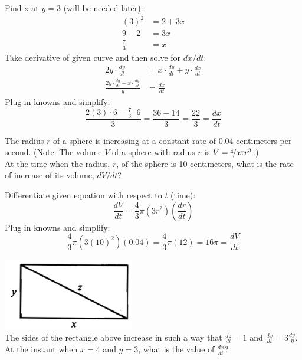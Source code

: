 \documentclass[12pt,letterpaper, onecolumn]{exam}
\begin{document}
\begin{questions}
\begin{solution}
			Find x at $y=3$ (will be needed later):
			\begin{align*}
				(3)^2 &= 2 + 3x \\
				9 - 2 &= 3x \\
				\frac{7}{3} &= x
			\end{align*}
			Take derivative of given curve and then solve for $dx/dt$:
			\begin{align*}
				2y \cdot \frac{dy}{dt} &= x \cdot \frac{dy}{dt} + y \cdot \frac{dx}{dt} \\
				\frac{ 2y \cdot \frac{dy}{dt} - x \cdot \frac{dy}{dt} } { y } &= \frac{dx}{dt}
			\end{align*}
			Plug in knowns and simplify:
			$$\frac{ 2(3) \cdot 6 - \frac{7}{3} \cdot 6 } { 3 } = \frac{36-14}{3} = \boxed{\frac{22}{3} = \frac{dx}{dt}}$$
		\end{solution}
		\question The radius $r$ of a sphere is increasing at a constant rate of $0.04$ centimeters per second. (Note: The volume $V$ of a sphere with radius $r$ is $V= \nicefrac{4}{3} \pi r^3$.) \\
		At the time when the radius, $r$, of the sphere is 10 centimeters, what is the rate of increase of its volume, $dV/dt$?
		
		\begin{solution}
			Differentiate given equation with respect to $t$ (time):
			$$\frac{dV}{dt} = \frac{4}{3} \pi (3r^2) \left( \frac{dr}{dt}\right) $$
			Plug in knowns and simplify:
			$$\frac{4}{3} \pi (3(10)^2) (0.04) = \frac{4}{3} \pi (12) = \boxed{16\pi = \frac{dV}{dt}}$$
		\end{solution}
		\question \includegraphics[width=0.35\linewidth]{Question07-001} \\
		The sides of the rectangle above increase in such a way that $\frac{dz}{dt} = 1$ and $\frac{dx}{dt} = 3 \frac{dy}{dt}$. At the instant when $x = 4$ and $y = 3$, what is the value of $\frac{dx}{dt}$?
		

\end{questions}
\end{document}
